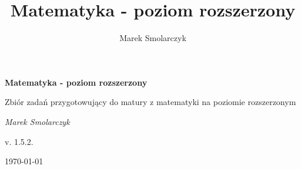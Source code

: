 \documentclass[a4paper,12pt]{book}
\begin{document}
\frontmatter

\begin{titlepage}
	\centering
	{ \bfseries \LARGE Matematyka - poziom rozszerzony \par }
	\vspace{1cm}
	{ \large Zbiór zadań przygotowujący do matury z matematyki na poziomie rozszerzonym \par }
	\vspace{3cm}
	{ \itshape \large Marek Smolarczyk \par }
	\vfill
	{ \large v. 1.5.2. \par }
	\vspace{0.2cm}
	{ \large \today \par }
\end{titlepage}

\author{Marek Smolarczyk}
\title{Matematyka - poziom rozszerzony}

\tableofcontents


\mainmatter



\backmatter
\end{document}
